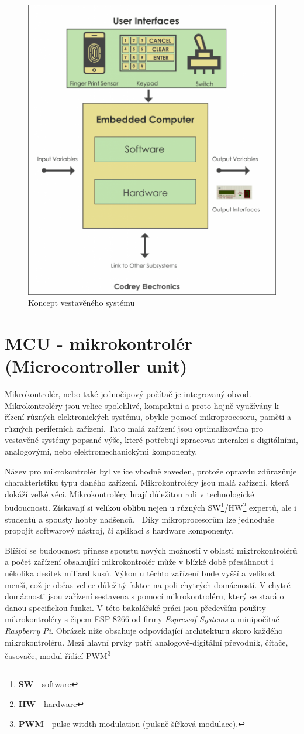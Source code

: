 \begin{figure}[hbt]
  \centering
  \includegraphics[width=.6 \linewidth]{obrazky-figures/embedded_system.png}
  \caption{
    Koncept vestavěného systému
  }
  \label{figure:embedded}
\end{figure}

\newpage
\section{MCU - mikrokontrolér (Microcontroller unit)}
\label{terminy:mcu}

Mikrokontrolér, nebo také jednočipový počítač je integrovaný obvod.
Mikrokontroléry jsou velice spolehlivé, kompaktní a proto hojně využívány k řízení různých elektronických systému, obykle pomocí mikroprocesoru, paměti a různých periferních zařízení.
Tato malá zařízení jsou optimalizována pro vestavěné systémy popsané výše, které potřebují zpracovat interakci s digitálními, analogovými, nebo elektromechanickými komponenty.

Název pro mikrokontrolér byl velice vhodně zaveden, protože opravdu zdůrazňuje charakteristiku typu daného zařízení. Mikrokontroléry jsou malá zařízení, která dokáží velké věci.
Mikrokontroléry hrají důležitou roli v technologické budoucnosti. Získavají si velikou oblibu nejen u různých SW\footnote{\textbf{SW} - software}/HW\footnote{\textbf{HW} - hardware} expertů, ale i studentů a spousty hobby nadšenců.~\cite{mcu:info}
Díky mikroprocesorům lze jednoduše propojit softwarový nástroj, či aplikaci s hardware komponenty.

Blížící se budoucnost přinese spoustu nových možností v oblasti miktrokontrolérů
a počet zařízení obsahující mikrokontrolér může v blízké době přesáhnout i několika desítek miliard kusů. Výkon u těchto zařízení bude vyšší a velikost menší, což je občas velice důležitý faktor na poli chytrých domácností.
V chytré domácnosti jsou zařízení sestavena s pomocí mikrokontroléru, který se stará o danou specifickou funkci. V této bakalářské práci jsou především použity mikrokontroléry s čipem ESP-8266 od firmy \emph{Espressif Systems}
a minipočítač \emph{Raspberry Pi}. Obrázek níže obsahuje odpovídající architekturu skoro každého mikrokontroléru.
Mezi hlavní prvky patří analogově-digitální převodník, čítače, časovače, modul řídící PWM\footnote{\textbf{PWM} - pulse-witdth modulation (pulsně šířková modulace). }

